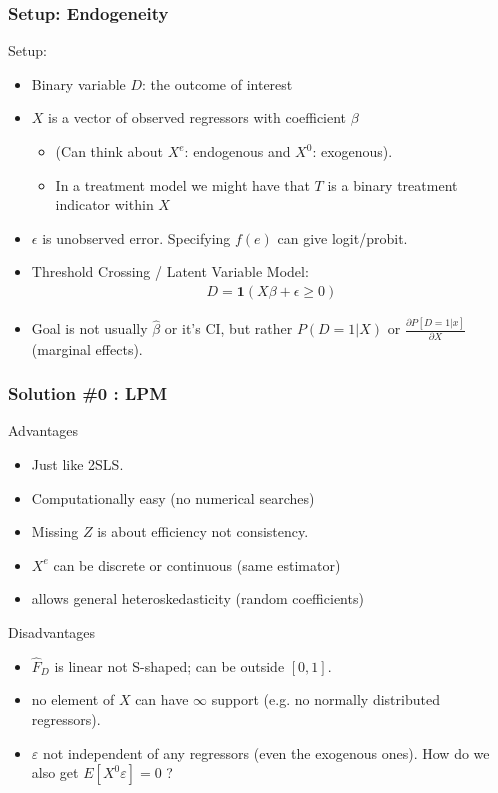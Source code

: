 \begin{frame}
\frametitle{Setup: Endogeneity}
Setup:
\begin{itemize}
\item Binary variable $D$: the outcome of interest
\item $X$ is a vector of observed regressors with coefficient $\beta$ 
\begin{itemize}
\item (Can think about $X^e$: endogenous and $X^0$: exogenous).
\item In a treatment model we might have that $T$ is a binary treatment indicator within $X$
\end{itemize}
\item $\epsilon$ is unobserved error. Specifying $f(e)$ can give logit/probit.
\item Threshold Crossing / Latent Variable Model:
\begin{eqnarray*}
D = \mathbf{1}(X \beta + \epsilon \geq 0)
\end{eqnarray*}
\item Goal is not usually $\hat{\beta}$ or it's CI, but rather $P(D=1 | X)$ or $\frac{\partial P[D=1 | x] }{\partial X}$ (marginal effects).
\end{itemize}
\end{frame}

\begin{frame}
\frametitle{Solution \#0 : LPM}
\vspace{-10pt}
\begin{block}{Advantages}
\vspace{-5pt}       
\begin{itemize}
\item Just like 2SLS.
\item Computationally easy (no numerical searches)
\item Missing $Z$ is about efficiency not consistency.
\item $X^e$ can be discrete or continuous (same estimator)
\item allows general heteroskedasticity (random coefficients)
\end{itemize}
\end{block}
\vspace{-5pt}       

\begin{block}{Disadvantages}
\vspace{-5pt}
\begin{itemize}
\item $\hat{F}_D$ is linear not S-shaped; can be outside $[0,1]$.
\item no element of $X$ can have $\infty$ support (e.g. no normally distributed regressors).
\item $\varepsilon$ not independent of any regressors  (even the exogenous ones). How do we also get $E[X^0 \varepsilon] =0$ ?
\end{itemize}
\end{block}
\end{frame}


